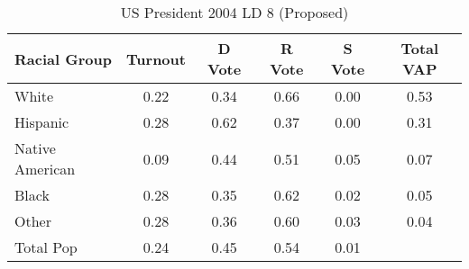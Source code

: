 \begin{table}[htb]
\begin{center}
\caption{US President 2004 LD 8 (Proposed)}
\label{pres04_vap_ld_8}
\begin{tabular}{lccccc}
  \hline
Racial Group & Turnout & D Vote & R Vote & S Vote & Total VAP \\ 
  \hline
White & 0.22 & 0.34 & 0.66 & 0.00 & 0.53 \\ 
  Hispanic & 0.28 & 0.62 & 0.37 & 0.00 & 0.31 \\ 
  Native American & 0.09 & 0.44 & 0.51 & 0.05 & 0.07 \\ 
  Black & 0.28 & 0.35 & 0.62 & 0.02 & 0.05 \\ 
  Other & 0.28 & 0.36 & 0.60 & 0.03 & 0.04 \\ 
  Total Pop & 0.24 & 0.45 & 0.54 & 0.01 &  \\ 
   \hline
\end{tabular}
\end{center}
\end{table}
